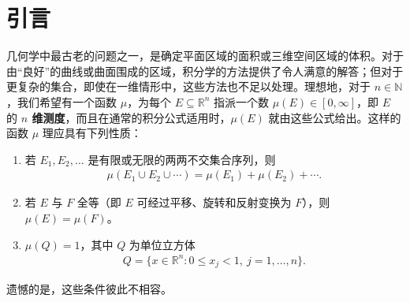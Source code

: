 \documentclass[../../main.tex]{subfiles}%
\begin{document}
\section{引言}\label{section:ch01-introduction}

几何学中最古老的问题之一，是确定平面区域的面积或三维空间区域的体积。对于由“良好”的曲线或曲面围成的区域，积分学的方法提供了令人满意的解答；但对于更复杂的集合，即使在一维情形中，这些方法也不足以处理。理想地，对于 $n\in\mathbb{N}$，我们希望有一个函数 $\mu$，为每个 $E\subseteq\mathbb{R}^n$ 指派一个数 $\mu(E)\in[0,\infty]$，即 $E$ 的 \textbf{$n$ 维测度}，而且在通常的积分公式适用时，$\mu(E)$ 就由这些公式给出。这样的函数 $\mu$ 理应具有下列性质：

\begin{enumerate}[label=\roman*.,ref=(\roman*)]
\item\label{item:ch01-desired-additivity} 若 $E_1,E_2,\ldots$ 是有限或无限的两两不交集合序列，则
\begin{align*}
\mu(E_1\cup E_2\cup\cdots)=\mu(E_1)+\mu(E_2)+\cdots.
\end{align*}
\item\label{item:ch01-desired-congruence} 若 $E$ 与 $F$ 全等（即 $E$ 可经过平移、旋转和反射变换为 $F$），则 $\mu(E)=\mu(F)$。
\item\label{item:ch01-desired-normalization} $\mu(Q)=1$，其中 $Q$ 为单位立方体
\begin{align*}
Q=\{x\in\mathbb{R}^n:0\leqslant x_j<1,\ j=1,\ldots,n\}.
\end{align*}
\end{enumerate}


\begin{proposition}\label{proposition:ch01-vitali-construction}
遗憾的是，这些条件彼此不相容。
\end{proposition}
\end{document}
